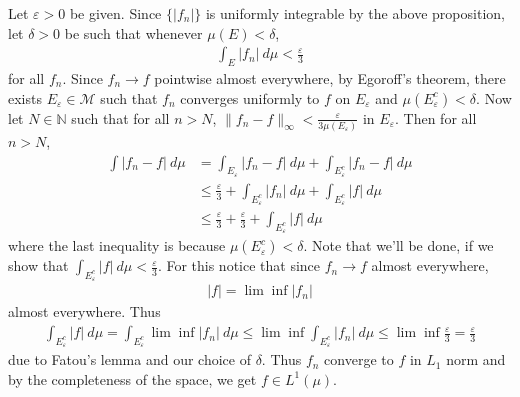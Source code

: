 \documentclass[12pt]{exam}
\theoremstyle{plain} %
\theoremstyle{definition} %
\theoremstyle{remark} %
\begin{document}
\begin{questions}
\begin{solution}
    Let $\varepsilon > 0$ be given. Since $\{ |f_n| \}$ is uniformly
    integrable by the above proposition, let $\delta > 0$ be such that
    whenever $\mu(E) < \delta$,
    \begin{align*}
      \int_E |f_n| \ d \mu  < \frac{\varepsilon}{3}
    \end{align*}
    for all $f_n$.
    Since $f_n \to f$ pointwise
    almost everywhere, by Egoroff's theorem, there exists
    $E_\varepsilon \in \mathcal{M}$ such that $f_n$ converges
    uniformly to $f$ on
    $E_\varepsilon$ and $ \mu(E_\varepsilon^c)< \delta$. Now let $N
    \in \mathbb{N}$ such that for all $n > N$, $\|f_n - f\|_\infty <
    \frac{\varepsilon}{3 \mu(E_\varepsilon)}$ in $E_\varepsilon$.
    Then for all $n > N$,
    \begin{align*}
      \int |f_n - f| \ d \mu &= \int_{E_\varepsilon} |f_n - f| \ d
      \mu + \int_{E^c_\varepsilon}
      |f_n - f| \ d \mu \\
      &\le \frac{\varepsilon}{3} + \int_{E_\varepsilon^c} |f_n| \ d
      \mu + \int_{E_\varepsilon^c} |f| \ d \mu \\
      &\le \frac{\varepsilon}{3} + \frac{\varepsilon}{3} +
      \int_{E_\varepsilon^c} |f| \ d \mu
    \end{align*}
    where the last inequality is because $\mu(E_\varepsilon^c) <
    \delta$. Note that we'll be done, if we show that
    $\int_{E_\varepsilon^c} |f| \ d \mu < \frac{\varepsilon}{3}$. For
    this notice that since $f_n \to f$ almost everywhere,
    \begin{align*}
      |f| = \lim \inf |f_n|
    \end{align*}
    almost everywhere.
    Thus
    \begin{align*}
      \int_{E_\varepsilon^c} |f| \ d \mu = \int_{E^c_\varepsilon}
      \lim \inf |f_n| \ d \mu \le \lim \inf \int_{E_\varepsilon^c}
      |f_n| \ d \mu \le \lim \inf \frac{\varepsilon}{3} =
      \frac{\varepsilon}{3}
    \end{align*}
    due to Fatou's lemma and our choice of $\delta$. Thus $f_n$
    converge to $ f$ in $L_1$ norm and by the completeness of the
    space, we get $ f \in L^{1}(\mu)$.
  \end{solution}


\end{questions}
\end{document}
